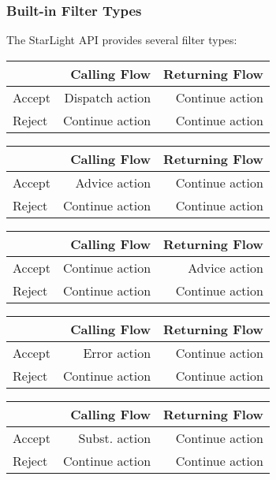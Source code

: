 \subsubsection{Built-in Filter Types}
The StarLight API provides several filter types:
\begin{description}[style=sameline,leftmargin=28mm]
\item[Dispatch]
\begin{tabular}{lrr}
 & Calling Flow& Returning Flow \\\hline
Accept & Dispatch action & Continue action\\
Reject & Continue action & Continue action\\
\end{tabular}

\item[Before]
\begin{tabular}{lrr}
 & Calling Flow& Returning Flow \\\hline
Accept & Advice action & Continue action\\
Reject & Continue action & Continue action\\
\end{tabular}

\item[After]
\begin{tabular}{lrr}
 & Calling Flow& Returning Flow \\\hline
Accept & Continue action & Advice action\\
Reject & Continue action & Continue action\\
\end{tabular}

\item[Error]
\begin{tabular}{lrr}
 & Calling Flow& Returning Flow \\\hline
Accept & Error action & Continue action\\
Reject & Continue action & Continue action\\
\end{tabular}

\item[Substitution]
\begin{tabular}{lrr}
 & Calling Flow& Returning Flow \\\hline
Accept & Subst. action & Continue action\\
Reject & Continue action & Continue action\\
\end{tabular}
\end{description}


